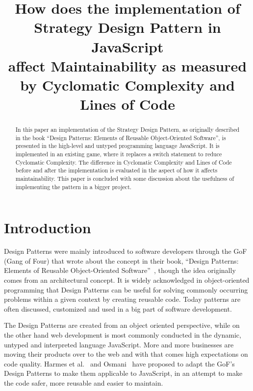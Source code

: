 \documentclass[conference, a4paper]{IEEEtran}
\begin{document}
\title{How does the implementation of\\
Strategy Design Pattern in JavaScript\\
affect Maintainability as measured by Cyclomatic Complexity and Lines of Code}
\author{
}

\maketitle

\begin{abstract}
	 In this paper an implementation of the Strategy Design Pattern, as originally described in the book ``Design Patterns: Elements of Reusable Object-Oriented Software'', is presented in the high-level and untyped programming language JavaScript. It is implemented in an existing game, where it replaces a switch statement to reduce Cyclomatic Complexity. The difference in Cyclomatic Complexity and Lines of Code before and after the implementation is evaluated in the aspect of how it affects maintainability. This paper is concluded with some discussion about the usefulness of implementing the pattern in a bigger project.
\end{abstract}

\section{Introduction}
\label{sec:Introduction}
Design Patterns were mainly introduced to software developers through the GoF (Gang of Four) that wrote about the concept in their book, ``Design Patterns: Elements of Reusable Object-Oriented Software''~\cite{bibitem:GoF}, though the idea originally comes from an architectural concept. It is widely acknowledged in object-oriented programming that Design Patterns can be useful for solving commonly occurring problems within a given context  by creating reusable code. Today patterns are often discussed, customized and used in a big part of software development.

The Design Patterns are created from an object oriented perspective, while on the other hand web development is most commonly conducted in the dynamic, untyped and interpreted language JavaScript. More and more businesses are moving their products over to the web and with that comes high expectations on code quality. Harmes et al.~\cite{bibitem:DiazHarmes} and Osmani~\cite{bibitem:Osmani} have proposed to adapt the GoF's Design Patterns to make them applicable to JavaScript, in an attempt to make the code safer, more reusable and easier to maintain.
\end{document}
